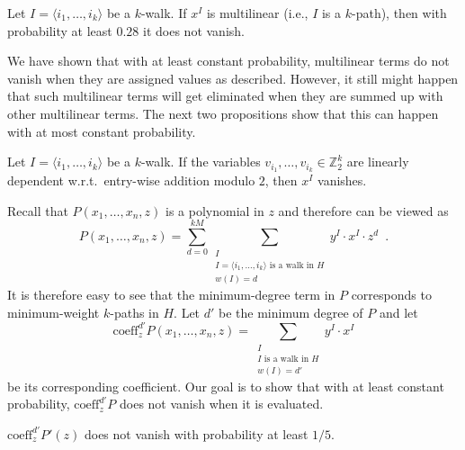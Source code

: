 \documentclass{llncs}
\newcommand{\coeff}{\mathrm{coeff}}
\newcommand{\ZZ}{\mathbb{Z}}
\begin{document}
\begin{corollary}\label{cor:2}
Let $I = \langle i_1,\ldots,i_k \rangle$ be a $k$-walk. If $x^I$ is multilinear (i.e., $I$ is a $k$-path), then with probability at least $0.28$ it does not vanish.
\end{corollary}

We have shown that with at least constant probability, multilinear terms do not vanish when they are assigned values as described. However, it still might happen that such multilinear terms will get eliminated when they are summed up with other multilinear terms. The next two propositions show that this can happen with at most constant probability.

\begin{proposition}\label{thr:dependent}
Let $I = \langle i_1,\ldots,i_k \rangle$ be a $k$-walk. If the variables $v_{i_1}, \ldots , v_{i_k} \in \ZZ_2^k$ are linearly dependent w.r.t.\ entry-wise addition modulo $2$, then $x^I$ vanishes.
\end{proposition}

Recall that $P(x_1, \ldots, x_n, z)$ is a polynomial in $z$ and therefore can be viewed as
\begin{equation}
P(x_1, \ldots, x_n, z) = \sum_{d=0}^{kM}\sum_{\substack{I\\I=\langle i_1,\ldots,i_k \rangle \text{ is a walk in }H\\w(I)=d}} y^I \cdot x^I \cdot z^{d}\enspace.
\end{equation}
It is therefore easy to see that the minimum-degree term in $P$ corresponds to minimum-weight $k$-paths in $H$. Let $d'$ be the minimum degree of $P$ and let 
\begin{equation}
\coeff_z^{d'} P(x_1, \ldots, x_n, z) = \sum_{\substack{I\\I \text{ is a walk in }H\\w(I)=d'}} y^I \cdot x^I
\end{equation}
 be its corresponding coefficient.
Our goal is to show that with at least constant probability, $\coeff_z^{d'} P$ does not vanish when it is evaluated.
\begin{proposition}\label{pro:high-pro}
$\coeff_z^{d'} P'(z)$ does not vanish with probability at least $1/5$.
\end{proposition}
\end{document}
